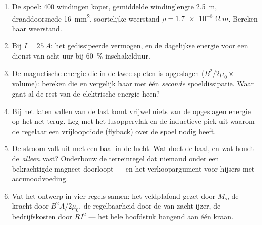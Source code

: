 \begin{problem}
\begin{enumerate}[resume]
  \item De spoel: 400 windingen koper, gemiddelde windinglengte
        \qty{2.5}{m}, draaddoorsnede \qty{16}{mm^2}, soortelijke weerstand
        $\rho = \qty{1.7e-8}{\Omega.m}$. Bereken haar weerstand.
  \item Bij $I = \qty{25}{A}$: het gedissipeerde vermogen, en de dagelijkse
        energie voor een dienst van acht uur bij \qty{60}{\percent} inschakelduur.
  \item De magnetische energie die in de twee spleten is opgeslagen
        ($B^2/2\mu_0 \times$ volume): bereken die en vergelijk haar met
        één \emph{seconde} spoeldissipatie. Waar gaat al de
        rest van de elektrische energie heen?
  \item Bij het laten vallen van de last komt vrijwel niets van de opgeslagen
        energie op het net terug. Leg met het lusoppervlak en de
        inductieve piek uit waarom de regelaar een vrijloopdiode
        (flyback) over de spoel nodig heeft.
  \item De stroom valt uit met een baal in de lucht. Wat doet de baal,
        en wat houdt de  \emph{alleen} vast? Onderbouw
        de terreinregel dat niemand onder een bekrachtigde magneet doorloopt ---
        en het verkoopargument voor hijsers met accunoodvoeding.
  \item Vat het ontwerp in vier regels samen: het veldplafond gezet door
        $M_{\text{s}}$, de kracht door $B^2A/2\mu_0$, de regelbaarheid door
        de  van zacht ijzer, de bedrijfskosten door $RI^2$ --- het
        hele hoofdstuk hangend aan één kraan.
\end{enumerate}
\end{problem}
